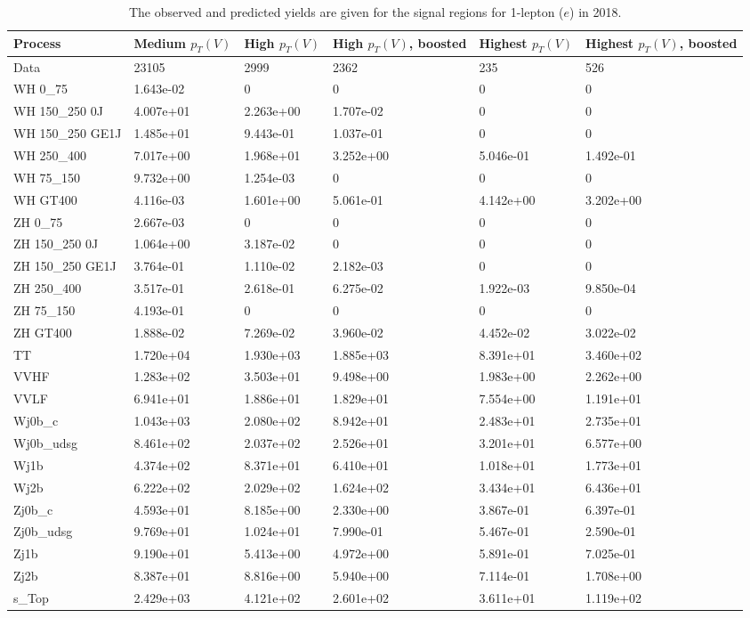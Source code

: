 \begin{table}
\centering
\caption[2018 1-lepton ($e$) signal selection yields]{
                  The observed and predicted yields are given for the
                  signal regions for 1-lepton ($e$) in 2018.
                  }
{\footnotesize
\begin{tabularx}{\textwidth}{|X|X|X|X|X|X|}
\hline
Process & Medium $p_{T}(V)$ & High $p_{T}(V)$ & High $p_{T}(V)$, boosted & Highest $p_{T}(V)$ & Highest $p_{T}(V)$, boosted \\
\hline
Data & 23105 & 2999 & 2362 & 235 & 526 \\
\hline
WH 0\_75 & 1.643e-02 & 0 & 0 & 0 & 0 \\
WH 150\_250 0J & 4.007e+01 & 2.263e+00 & 1.707e-02 & 0 & 0 \\
WH 150\_250 GE1J & 1.485e+01 & 9.443e-01 & 1.037e-01 & 0 & 0 \\
WH 250\_400 & 7.017e+00 & 1.968e+01 & 3.252e+00 & 5.046e-01 & 1.492e-01 \\
WH 75\_150 & 9.732e+00 & 1.254e-03 & 0 & 0 & 0 \\
WH GT400 & 4.116e-03 & 1.601e+00 & 5.061e-01 & 4.142e+00 & 3.202e+00 \\
ZH 0\_75 & 2.667e-03 & 0 & 0 & 0 & 0 \\
ZH 150\_250 0J & 1.064e+00 & 3.187e-02 & 0 & 0 & 0 \\
ZH 150\_250 GE1J & 3.764e-01 & 1.110e-02 & 2.182e-03 & 0 & 0 \\
ZH 250\_400 & 3.517e-01 & 2.618e-01 & 6.275e-02 & 1.922e-03 & 9.850e-04 \\
ZH 75\_150 & 4.193e-01 & 0 & 0 & 0 & 0 \\
ZH GT400 & 1.888e-02 & 7.269e-02 & 3.960e-02 & 4.452e-02 & 3.022e-02 \\
\hline
TT & 1.720e+04 & 1.930e+03 & 1.885e+03 & 8.391e+01 & 3.460e+02 \\
VVHF & 1.283e+02 & 3.503e+01 & 9.498e+00 & 1.983e+00 & 2.262e+00 \\
VVLF & 6.941e+01 & 1.886e+01 & 1.829e+01 & 7.554e+00 & 1.191e+01 \\
Wj0b\_c & 1.043e+03 & 2.080e+02 & 8.942e+01 & 2.483e+01 & 2.735e+01 \\
Wj0b\_udsg & 8.461e+02 & 2.037e+02 & 2.526e+01 & 3.201e+01 & 6.577e+00 \\
Wj1b & 4.374e+02 & 8.371e+01 & 6.410e+01 & 1.018e+01 & 1.773e+01 \\
Wj2b & 6.222e+02 & 2.029e+02 & 1.624e+02 & 3.434e+01 & 6.436e+01 \\
Zj0b\_c & 4.593e+01 & 8.185e+00 & 2.330e+00 & 3.867e-01 & 6.397e-01 \\
Zj0b\_udsg & 9.769e+01 & 1.024e+01 & 7.990e-01 & 5.467e-01 & 2.590e-01 \\
Zj1b & 9.190e+01 & 5.413e+00 & 4.972e+00 & 5.891e-01 & 7.025e-01 \\
Zj2b & 8.387e+01 & 8.816e+00 & 5.940e+00 & 7.114e-01 & 1.708e+00 \\
s\_Top & 2.429e+03 & 4.121e+02 & 2.601e+02 & 3.611e+01 & 1.119e+02 \\
\hline
\end{tabularx}
}
\label{tab:sr-Wen-2018}
\end{table}

